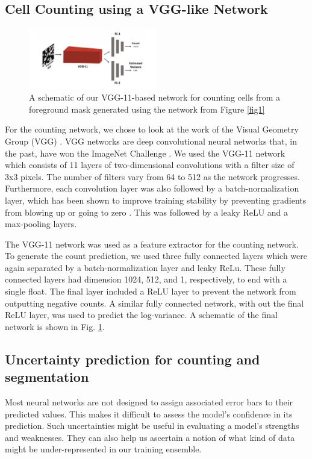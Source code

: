 \documentclass[10pt,twocolumn,letterpaper]{article}
\begin{document}
\subsection{Cell Counting using a VGG-like Network}

\begin{figure}[!h]
\centering
\includegraphics[width=0.5\textwidth]{count}
\caption{A schematic of our VGG-11-based network for counting cells from a foreground mask generated using the network from Figure \ref{fig1}}
\label{fig2}
\end{figure}

For the counting network, we chose to look at the work of the Visual Geometry Group (VGG) \cite{vgg}.
VGG networks are deep convolutional neural networks that, in the past, have won the ImageNet Challenge \cite{vgg}.
We used the VGG-11 network which consists of 11 layers of two-dimensional convolutions with a filter size of 3x3 pixels.
The number of filters vary from 64 to 512 as the network progresses. Furthermore, each convolution layer was also followed by a batch-normalization layer, which has been shown to improve training stability by preventing gradients from blowing up or going to zero \cite{batchnorm}. This was followed by a leaky ReLU and a max-pooling layers.

The VGG-11 network was used as a feature extractor for the counting network. To generate the count prediction, we used three fully connected layers which were again separated by a batch-normalization layer and leaky ReLu. These fully connected layers had dimension 1024, 512, and 1, respectively, to end with a single float. The final layer included a ReLU layer to prevent the network from outputting negative counts. A similar fully connected network, with out the final ReLU layer, was used to predict the log-variance.
A schematic of the final network is shown in Fig. \ref{fig2}.


\subsection{Uncertainty prediction for counting and segmentation}
Most neural networks are not designed to assign associated error bars to their predicted values. This makes it difficult to assess the model's confidence in its prediction. Such uncertainties might be useful in evaluating a model's strengths and weaknesses. They can also help us ascertain a notion of what kind of data might be under-represented in our training ensemble.
\end{document}
